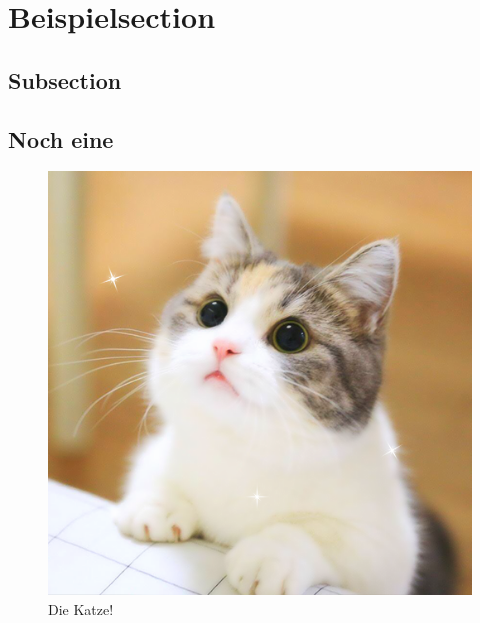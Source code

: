 \section{Beispielsection}

	\subsection{Subsection}
	
		\lipsum     

	\subsection{Noch eine}
	
		\lipsum
		
		\begin{figure}[H]
			\centering
			\includegraphics[width=\linewidth]{resource/cat.png}
			\caption{Die Katze!}
			\label{fig:cat}		
		\end{figure}
	
		